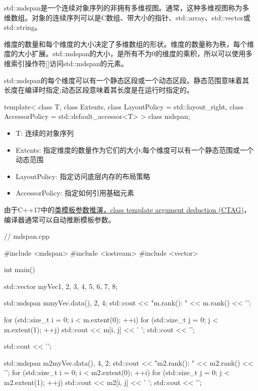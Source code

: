 std::mdspan是一个连续对象序列的非拥有多维视图。通常，这种多维视图称为多维数组。对象的连续序列可以是C数组、带大小的指针、std::array、std::vector或std::string。

维度的数量和每个维度的大小决定了多维数组的形状。维度的数量称为秩，每个维度的大小扩展。std::mdspan的大小，是所有不为0的维度的乘积，所以可以使用多维索引操作符[]访问std::mdspan的元素。

std::mdspan的每个维度可以有一个静态区段或一个动态区段。静态范围意味着其长度在编译时指定;动态区段意味着其长度是在运行时指定的。


\begin{cpp}
template<
	class T,
	class Extents,
	class LayoutPolicy = std::layout_right,
	class AccessorPolicy = std::default_accessor<T>
> class mdspan;
\end{cpp}

\begin{itemize}
\item 
T: 连续的对象序列

\item 
Extents: 指定维度的数量作为它们的大小;每个维度可以有一个静态范围或一个动态范围

\item 
LayoutPolicy: 指定访问底层内存的布局策略

\item 
AccessorPolicy: 指定如何引用基础元素
\end{itemize}

由于C++17中的\href{https://en.cppreference.com/w/cpp/language/class_template_argument_deduction}{类模板参数推演，class template argument deduction (CTAG)}，编译器通常可以自动推断模板参数。


\begin{cpp}
// mdspan.cpp

#include <mdspan>
#include <iostream>
#include <vector>

int main() {

	std::vector myVec{1, 2, 3, 4, 5, 6, 7, 8};
	
	std::mdspan m{myVec.data(), 2, 4};
	std::cout << "m.rank(): " << m.rank() << '\n';
	
	for (std::size_t i = 0; i < m.extent(0); ++i) {
		for (std::size_t j = 0; j < m.extent(1); ++j) {
			std::cout << m[i, j] << ' ';
		}
		std::cout << '\n';
	}
	
	std::cout << '\n';
	
	std::mdspan m2{myVec.data(), 4, 2};
	std::cout << "m2.rank(): " << m2.rank() << '\n';
	for (std::size_t i = 0; i < m2.extent(0); ++i) {
		for (std::size_t j = 0; j < m2.extent(1); ++j) {
			std::cout << m2[i, j] << ' ';
		}
		std::cout << '\n';
	}

}
\end{cpp}

